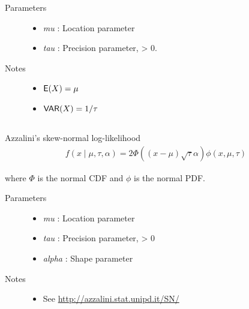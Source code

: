 \documentclass[]{jss}
\begin{document}
\begin{description}
\item[Parameters] \leavevmode\begin{itemize}

\item {} 
\emph{mu} : Location parameter

\item {} 
\emph{tau} : Precision parameter, \textgreater{} 0.

\end{itemize}

\item[Notes]\leavevmode\begin{itemize}
\item {} 
$\mathsf{E}(X) = \mu$

\item {} 
$\mathsf{VAR}(X) = 1/\tau$

\end{itemize}

\end{description}


\subsection[skew normal]{ }

Azzalini's skew-normal log-likelihood
\begin{eqnarray*}
f(x \mid \mu, \tau, \alpha) = 2 \Phi((x-\mu)\sqrt{\tau}\alpha) \phi(x,\mu,\tau)    
\end{eqnarray*}

where $\Phi$ is the normal CDF and $\phi$ is the normal PDF.

\begin{description}
\item[Parameters] \leavevmode\begin{itemize}


\item {} 
\emph{mu} : Location parameter

\item {} 
\emph{tau} : Precision parameter, \textgreater{} 0

\item {} 
\emph{alpha} : Shape parameter

\end{itemize}

\item[Notes]\leavevmode
\begin{itemize}
    \item {}
    See \href{http://azzalini.stat.unipd.it/SN/}{http://azzalini.stat.unipd.it/SN/}
\end{itemize}

\end{description}
\end{document}
